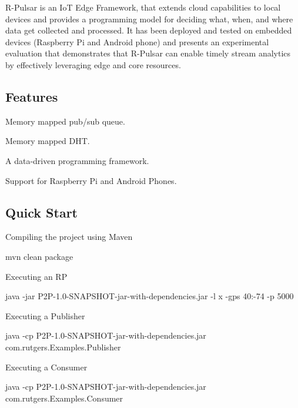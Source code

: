 R-\/\+Pulsar is an IoT Edge Framework, that extends cloud capabilities to local devices and provides a programming model for deciding what, when, and where data get collected and processed. It has been deployed and tested on embedded devices (Raspberry Pi and Android phone) and presents an experimental evaluation that demonstrates that R-\/\+Pulsar can enable timely stream analytics by effectively leveraging edge and core resources.

\subsection*{Features}


\begin{DoxyItemize}
\item Memory mapped pub/sub queue.
\item Memory mapped D\+HT.
\item A data-\/driven programming framework.
\item Support for Raspberry Pi and Android Phones.
\end{DoxyItemize}

\subsection*{Quick Start}

Compiling the project using Maven


\begin{DoxyCode}
mvn clean package
\end{DoxyCode}


Executing an RP


\begin{DoxyCode}
java -jar P2P-1.0-SNAPSHOT-jar-with-dependencies.jar  -l x -gps 40:-74 -p 5000
\end{DoxyCode}


Executing a Publisher


\begin{DoxyCode}
java -cp P2P-1.0-SNAPSHOT-jar-with-dependencies.jar com.rutgers.Examples.Publisher
\end{DoxyCode}


Executing a Consumer


\begin{DoxyCode}
java -cp P2P-1.0-SNAPSHOT-jar-with-dependencies.jar com.rutgers.Examples.Consumer
\end{DoxyCode}


